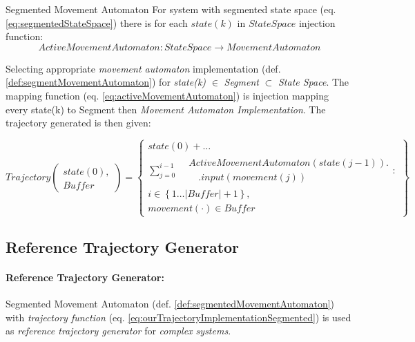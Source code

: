 \begin{definition}{Segmented Movement Automaton}\label{def:segmentedMovementAutomaton}
    For system with segmented state space (eq. \ref{eq:segmentedStateSpace}) there is for each $state(k)$ in $StateSpace$ injection function:
    \begin{equation} \label{eq:activeMovementAutomaton}
        ActiveMovementAutomaton:StateSpace\to MovementAutomaton
    \end{equation}
    
\noindent Selecting appropriate \emph{movement automaton} implementation (def. \ref{def:segmentMovementAutomaton}) for \emph{state(k)} $\in$ \emph{Segment} $\subset$ \emph{State Space}. The mapping function (eq. \ref{eq:activeMovementAutomaton}) is injection mapping every state(k) to Segment then \emph{Movement Automaton Implementation}. The trajectory generated is then given:
    
    \begin{equation}\label{eq:ourTrajectoryImplementationSegmented}
        Trajectory\left(\begin{gathered}state(0),\\Buffer\end{gathered}\right)= 
        \left\{
            \begin{gathered}
                state(0)+\dots\\\sum_{j=0}^{i-1} 
                    \begin{aligned} 
                        &ActiveMovementAutomaton(state(j-1)).\\
                        &\quad.input(movement(j))
                    \end{aligned}:\\
                i \in\left\{1\dots |Buffer|+1\right\}, \\
                movement(\cdot) \in Buffer
            \end{gathered}
        \right\}
    \end{equation}
    
\end{definition}

\newpage
\subsection{Reference Trajectory Generator}\label{s:referenceTrajectoryGenerator}

\paragraph{Reference Trajectory Generator:} Segmented Movement Automaton (def.  \ref{def:segmentedMovementAutomaton}) with \emph{trajectory function} (eq. \ref{eq:ourTrajectoryImplementationSegmented}) is used as \emph{reference trajectory generator} for \emph{complex systems}. 

